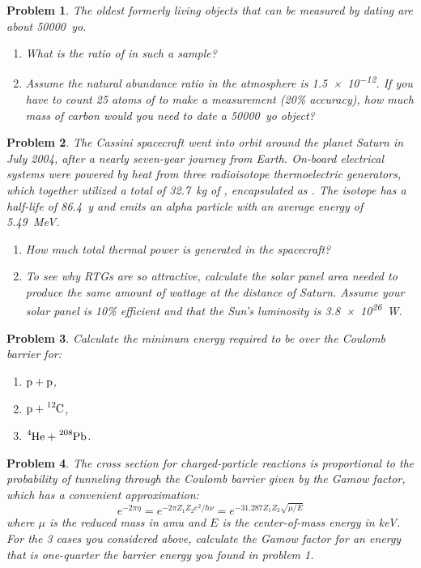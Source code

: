 \documentclass{article}
\newtheorem{plm}{Problem}
\begin{document}
\begin{plm}
  The oldest formerly living objects that can be measured by  dating are about \SI{50000}{yo}.
  \begin{enumerate}
  \item What is the ratio of  in such a sample?
  \item Assume the natural abundance ratio in the atmosphere is \SI{1.5e-12}{}.
    If you have to count 25 atoms of  to make a measurement (20\% accuracy),
    how much mass of carbon would you need to date a \SI{50000}{yo} object?
  \end{enumerate}
\end{plm}
\begin{plm}
  The Cassini spacecraft went into orbit around the planet Saturn in July 2004, after a nearly seven-year journey from Earth.
  On-board electrical systems were powered by heat from three radioisotope thermoelectric generators,
  which together utilized a total of \SI{32.7}{kg} of , encapsulated as .
  The isotope has a half-life of \SI{86.4}{y} and emits an alpha particle with an average energy of \SI{5.49}{MeV}.
  \begin{enumerate}
  \item How much total thermal power is generated in the spacecraft?
  \item To see why RTGs are so attractive, calculate the solar panel area needed to produce the same amount of wattage at the distance of Saturn.
    Assume your solar panel is 10\% efficient and that the Sun's luminosity is \SI{3.8e26}{W}.
  \end{enumerate}
\end{plm}
\begin{plm}
  Calculate the minimum energy required to be over the Coulomb barrier for:
  \begin{enumerate}
  \item $\ce{p + p}$,
  \item $\ce{p + ^{12}C}$,
  \item $\ce{^{4}He + ^{208}Pb}$.
  \end{enumerate}
\end{plm}
\begin{plm}
  The cross section for charged-particle reactions is proportional to the probability of tunneling through the Coulomb barrier
  given by the Gamow factor, which has a convenient approximation:
  \[
    e^{-2\pi\eta} = e^{-2\pi Z_{1}Z_{2}e^{2}/\hbar\nu} = e^{-31.287Z_{1}Z_{2}\sqrt{\mu/E}}
  \]
  where $\mu$ is the reduced mass in \si{amu} and $E$ is the center-of-mass energy in \si{keV}.
  For the 3 cases you considered above, calculate the Gamow factor for an energy that is one-quarter the barrier energy you found in problem 1.
\end{plm}
\end{document}
